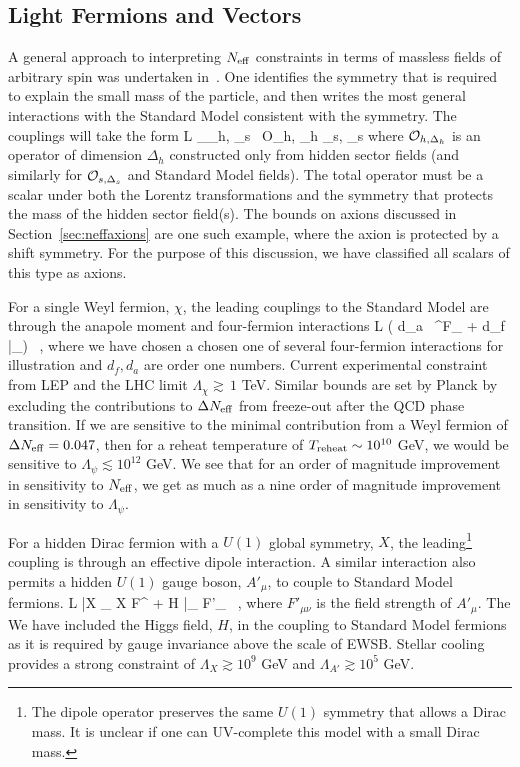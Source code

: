 \subsection{Light Fermions and Vectors}

A general approach to interpreting $N_{\rm eff}$ constraints in terms of massless fields of arbitrary spin was undertaken in~\cite{Brust:2013xpv}.  One identifies the symmetry that is required to explain  the small mass of the particle, and then writes the most general interactions with the Standard Model consistent with the symmetry.  The couplings will take the form
\beq
{\cal L} \supset \sum_{\Delta_h, \Delta_s}  \,  {\cal O}_{h, \Delta_h} _{s, \Delta_s}
\eeq
where ${\cal O}_{h,\Delta_h}$ is an operator of dimension $\Delta_h$ constructed only from hidden sector fields (and similarly for ${\cal O}_{s, \Delta_s}$ and Standard Model fields).  The total operator must be a scalar under both the Lorentz transformations and the symmetry that protects the mass of the hidden sector field(s).  The bounds on axions discussed in Section~\ref{sec:neffaxions} are one such example, where the axion is protected by a shift symmetry.  For the purpose of this discussion, we have classified all scalars of this type as axions.

For a single Weyl fermion, $\chi$, the leading couplings to the Standard Model are through the anapole moment and four-fermion interactions
\beq
{\cal L} \supset {} \Big( d_a  \, \partial^\nu F_{\mu \nu} + d_f \,  \bar \psi \gamma_\mu \psi \Big) \ ,
\eeq
where we have chosen a chosen one of several four-fermion interactions for illustration and $d_f, d_a$ are order one numbers.  Current experimental constraint from LEP and the LHC limit $\Lambda_\chi \gtrsim \, 1$ TeV.  Similar bounds are set by Planck by excluding the contributions to $\Delta N_{\rm eff}$ from freeze-out after the QCD phase transition.  If we are sensitive to the minimal contribution from a Weyl fermion of $\Delta N_{\rm eff} = 0.047$, then for a reheat temperature of $T_{\rm reheat} \sim 10^{10}$ GeV, we would be sensitive to $\Lambda_\psi \lesssim 10^{12}$ GeV.  We see that for an order of magnitude improvement in sensitivity to $N_{\rm eff}$, we get as much as a nine order of magnitude improvement in sensitivity to $\Lambda_\psi$.  

For a hidden Dirac fermion with a $U(1)$ global symmetry, $X$, the leading\footnote{The dipole operator preserves the same $U(1)$ symmetry that allows a Dirac mass.  It is unclear if one can UV-complete this model with a small Dirac mass.} coupling is through an effective dipole interaction.  A similar interaction also permits a hidden $U(1)$ gauge boson, $A'_\mu$, to couple to Standard Model fermions.
\beq
{\cal L} \supset  {} \bar X \sigma_{\mu\nu} X  F^{\mu \nu} +  H \bar \psi \sigma_{\mu\nu} \psi  F'_{\mu \nu}  \ ,
\eeq
where $F'_{\mu \nu}$ is the field strength of $A'_\mu$.  The We have included the Higgs field, $H$, in the coupling to Standard Model fermions as it is required by gauge invariance above the scale of EWSB.  Stellar cooling provides a strong constraint of $\Lambda_X \gtrsim 10^9$ GeV and $\Lambda_{A'} \gtrsim 10^5$ GeV.  

